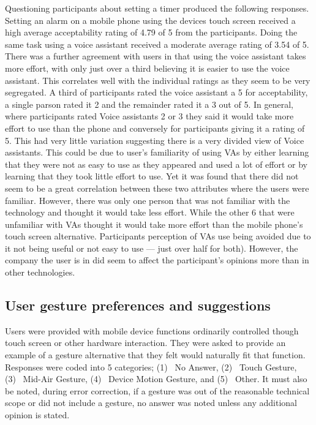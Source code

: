 \documentclass{l4proj}
\begin{document}
Questioning participants about setting a timer produced the following responses. Setting an alarm on a mobile phone using the devices touch screen received a high average acceptability rating of 4.79 of 5 from the participants. Doing the same task using a voice assistant received a moderate average rating of 3.54 of 5. There was a further agreement with users in that using the voice assistant takes more effort, with only just over a third believing it is easier to use the voice assistant. This correlates well with the individual ratings as they seem to be very segregated. A third of participants rated the voice assistant a 5 for acceptability, a single parson rated it 2 and the remainder rated it a 3 out of 5. In general, where participants rated Voice assistants 2 or 3 they said it would take more effort to use than the phone and conversely for participants giving it a rating of 5. This had very little variation suggesting there is a very divided view of Voice assistants. This could be due to user’s familiarity of using VAs by either learning that they were not as easy to use as they appeared and used a lot of effort or by learning that they took little effort to use. Yet it was found that there did not seem to be a great correlation between these two attributes where the users were familiar. However, there was only one person that was not familiar with the technology and thought it would take less effort. While the other 6 that were unfamiliar with VAs thought it would take more effort than the mobile phone's touch screen alternative. Participants perception of VAs use being avoided due to it not being useful or not easy to use --- just over half for both). However, the company the user is in did seem to affect the participant's opinions more than in other technologies.

\subsection{User gesture preferences and suggestions}

Users were provided with mobile device functions ordinarily controlled though touch screen or other hardware interaction. They were asked to provide an example of a gesture alternative that they felt would naturally fit that function. Responses were coded into 5 categories; (1)~ No Answer, (2)~ Touch Gesture, (3)~ Mid-Air Gesture, (4)~ Device Motion Gesture, and (5)~ Other. It must also be noted, during error correction, if a gesture was out of the reasonable technical scope or did not include a gesture, no answer was noted unless any additional opinion is stated.
\end{document}
